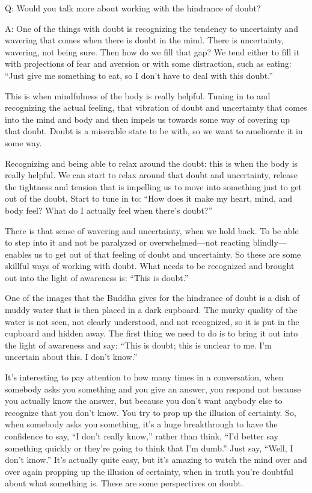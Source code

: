 \qaspace
Q: Would you talk more about working with the hindrance of doubt?

\qaspace
A: One of the things with doubt is recognizing the tendency to
uncertainty and wavering that comes when there is doubt in the mind.
There is uncertainty, wavering, not being sure. Then how do we fill that
gap? We tend either to fill it with projections of fear and aversion or
with some distraction, such as eating: “Just give me something to eat,
so I don’t have to deal with this doubt.”

This is when mindfulness of the body is really helpful. Tuning in to and
recognizing the actual feeling, that vibration of doubt and uncertainty
that comes into the mind and body and then impels us towards some way of
covering up that doubt. Doubt is a miserable state to be with, so we
want to ameliorate it in some way.

Recognizing and being able to relax around the doubt: this is when the
body is really helpful. We can start to relax around that doubt and
uncertainty, release the tightness and tension that is impelling us to
move into something just to get out of the doubt. Start to tune in to:
“How does it make my heart, mind, and body feel? What do I actually feel
when there’s doubt?”

There is that sense of wavering and uncertainty, when we hold back. To
be able to step into it and not be paralyzed or overwhelmed—not reacting
blindly—enables us to get out of that feeling of doubt and uncertainty.
So these are some skillful ways of working with doubt. What needs to be
recognized and brought out into the light of awareness is: “This is
doubt.”

One of the images that the Buddha gives for the hindrance of doubt is a
dish of muddy water that is then placed in a dark cupboard. The murky
quality of the water is not seen, not clearly understood, and not
recognized, so it is put in the cupboard and hidden away. The first
thing we need to do is to bring it out into the light of awareness and
say: “This is doubt; this is unclear to me. I’m uncertain about this. I
don’t know.”

It’s interesting to pay attention to how many times in a conversation,
when somebody asks you something and you give an answer, you respond not
because you actually know the answer, but because you don’t want anybody
else to recognize that you don’t know. You try to prop up the illusion
of certainty. So, when somebody asks you something, it’s a huge
breakthrough to have the confidence to say, “I don’t really know,”
rather than think, “I’d better say something quickly or they’re going to
think that I’m dumb.” Just say, “Well, I don’t know.” It’s actually
quite easy, but it’s amazing to watch the mind over and over again
propping up the illusion of certainty, when in truth you’re doubtful
about what something is. These are some perspectives on doubt.

